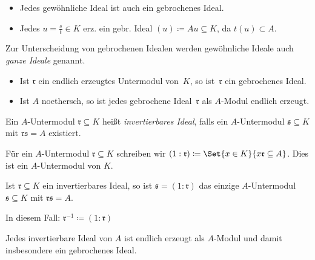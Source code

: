 \documentclass{cheat-sheet}
\newcommand{\rrr}{\mathfrak{r}}
\newcommand{\sss}{\mathfrak{s}}
\begin{document}
\begin{bspe}
  \begin{itemize}
    \item Jedes gewöhnliche Ideal ist auch ein gebrochenes Ideal.
    \item Jedes $u = \tfrac{s}{t} \in K$ erz. ein gebr. Ideal $(u) \coloneqq A u \subseteq K$, da $t (u) \subset A$.
  \end{itemize}
\end{bspe}

\begin{sprechweise}
  Zur Unterscheidung von gebrochenen Idealen werden gewöhnliche Ideale auch \emph{ganze Ideale} genannt.
\end{sprechweise}

\begin{prop}
  \begin{itemize}
    \item Ist $\rrr$ ein endlich erzeugtes Untermodul von~$K$, so ist~$\rrr$ ein gebrochenes Ideal.
    \item Ist $A$ noethersch, so ist jedes gebrochene Ideal~$\rrr$ als $A$-Modul endlich erzeugt.
  \end{itemize}
\end{prop}


\begin{defn}
  Ein $A$-Untermodul $\rrr \subseteq K$ heißt \emph{invertierbares Ideal}, falls ein $A$-Untermodul $\sss \subseteq K$ mit $\rrr \sss = A$ existiert.
\end{defn}

\begin{nota}
  Für ein $A$-Untermodul $\rrr \subseteq K$ schreiben wir $(1 : \rrr) \coloneqq \Set{x \in K}{x \rrr \subseteq A}$.
  Dies ist ein $A$-Untermodul von $K$.
\end{nota}

\begin{prop}
  Ist $\rrr \subseteq K$ ein invertierbares Ideal, so ist $\sss = (1 : \rrr)$ das einzige $A$-Untermodul $\sss \subseteq K$ mit $\rrr \sss = A$.
\end{prop}

\begin{nota}
  In diesem Fall: \enspace
  $\rrr^{-1} \coloneqq (1 : \rrr)$
\end{nota}

\begin{prop}
  Jedes invertierbare Ideal von $A$ ist endlich erzeugt als $A$-Modul und damit insbesondere ein gebrochenes Ideal.
\end{prop}
\end{document}
